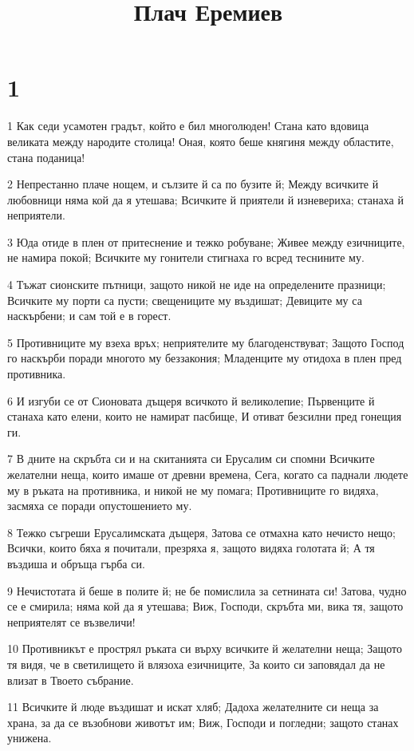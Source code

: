 

\title{Плач Еремиев}


\chapter{1}

\par 1 Как седи усамотен градът, който е бил многолюден! Стана като вдовица великата между народите столица! Оная, която беше княгиня между областите, стана поданица!
\par 2 Непрестанно плаче нощем, и сълзите й са по бузите й; Между всичките й любовници няма кой да я утешава; Всичките й приятели й изневериха; станаха й неприятели.
\par 3 Юда отиде в плен от притеснение и тежко робуване; Живее между езичниците, не намира покой; Всичките му гонители стигнаха го всред теснините му.
\par 4 Тъжат сионските пътници, защото никой не иде на определените празници; Всичките му порти са пусти; свещениците му въздишат; Девиците му са наскърбени; и сам той е в горест.
\par 5 Противниците му взеха връх; неприятелите му благоденствуват; Защото Господ го наскърби поради многото му беззакония; Младенците му отидоха в плен пред противника.
\par 6 И изгуби се от Сионовата дъщеря всичкото й великолепие; Първенците й станаха като елени, които не намират пасбище, И отиват безсилни пред гонещия ги.
\par 7 В дните на скръбта си и на скитанията си Ерусалим си спомни Всичките желателни неща, които имаше от древни времена, Сега, когато са паднали людете му в ръката на противника, и никой не му помага; Противниците го видяха, засмяха се поради опустошението му.
\par 8 Тежко съгреши Ерусалимската дъщеря, Затова се отмахна като нечисто нещо; Всички, които бяха я почитали, презряха я, защото видяха голотата й; А тя въздиша и обръща гърба си.
\par 9 Нечистотата й беше в полите й; не бе помислила за сетнината си! Затова, чудно се е смирила; няма кой да я утешава; Виж, Господи, скръбта ми, вика тя, защото неприятелят се възвеличи!
\par 10 Противникът е прострял ръката си върху всичките й желателни неща; Защото тя видя, че в светилището й влязоха езичниците, За които си заповядал да не влизат в Твоето събрание.
\par 11 Всичките й люде въздишат и искат хляб; Дадоха желателните си неща за храна, за да се възобнови животът им; Виж, Господи и погледни; защото станах унижена.
